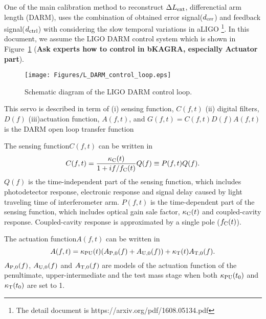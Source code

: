One of the main calibration method to reconstruct $\Delta L_{\rm ext}$, differenctial arm length (DARM), 
uses the combination of obtained error signal($d_{\rm err}$) and feedback signal($d_{\rm ctrl}$) 
with considering the slow temporal variations in aLIGO
\footnote{The detail document is https://arxiv.org/pdf/1608.05134.pdf}. 
In this document, we assume the LIGO DARM control system which is shown in Figure~\ref{fig:L_DARM_control_loop}
({\bf Ask experts how to control in bKAGRA, especially Actuator part}). 
\begin{figure}
\begin{center}
\texttt{[image: Figures/L\_DARM\_control\_loop.eps]}
\caption{Schematic diagram of the LIGO DARM control loop.}
\label{fig:L_DARM_control_loop} 
\end{center}
\end{figure}
This servo is described in term of 
(i) sensing function, $C(f,t)$ 
(ii) digital filters, $D(f)$ 
(iii)actuation function, $A(f,t)$, 
and $G(f,t) = C(f,t)D(f)A(f,t)$ is the DARM open loop transfer function  

The sensing function$C(f,t)$ can be written in
\begin{equation}
C(f,t) = \frac{\kappa_{\rm C}(t)}{1+if/f_{\rm C}(t)}Q(f) \equiv P(f,t) Q(f).
\end{equation}
$Q(f)$ is the time-independent part of the sensing function, which includes
photodetector response,
electronic response
and signal delay caused by light traveling time of interferometer arm.
$P(f,t)$ is the time-dependent part of the sensing function, which includes
optical gain sale factor, $\kappa_{\rm C}(t)$ and coupled-cavity response.
Coupled-cavity response is approximated by a single pole ($f_{\rm C}(t)$).

The actuation function$A(f,t)$ can be written in
\begin{equation}
A(f,t) = \kappa_{\rm PU}(t)(A_{\rm P,0}(f)+A_{\rm U,0}(f)) + \kappa_{\rm T}(t) A_{\rm T,0}(f).
\end{equation}
$A_{\rm P,0}(f)$, $A_{\rm U,0}(f)$ and $A_{\rm T,0}(f)$ are models of the actuation function 
of the penultimate, upper-intermediate and the test mass stage 
when both $\kappa_{\rm PU}(t_0)$ and $\kappa_{\rm T}(t_0)$ are set to 1.

